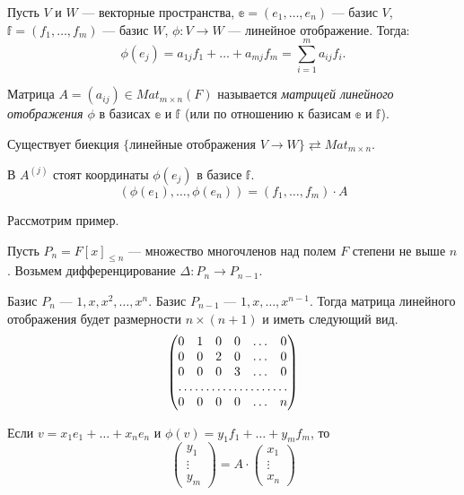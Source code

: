 Пусть $V$ и $W$ --- векторные пространства, $\mathbb{e} = (e_1, \ldots, e_n)$ --- базис $V$, $\mathbb{f} = (f_1, \ldots, f_m)$ --- базис $W$, $\phi: V \rightarrow W$ --- линейное отображение. Тогда:
\[
\phi(e_j) = a_{1j}f_1 + \ldots + a_{mj}f_m = \sum_{i = 1}^{m}a_{ij}f_i.
\]

\begin{Def}
Матрица $A = (a_{ij}) \in Mat_{m \times n}(F)$ называется \textit{матрицей линейного отображения $\phi$} в базисах $\mathbb{e}$ и $\mathbb{f}$ (или по отношению к базисам $\mathbb{e}$ и $\mathbb{f}$).
\end{Def}

\begin{Comment}
Существует биекция $\{\text{линейные отображения } V \rightarrow W \} \rightleftarrows Mat_{m\times n}$.
\end{Comment}

\begin{Comment}
В $A^{(j)}$ стоят координаты $\phi(e_j)$ в базисе $\mathbb{f}$.
\[
(\phi(e_1), \ldots, \phi(e_n)) = (f_1, \ldots, f_m)\cdot A
\]
\end{Comment}

Рассмотрим пример.

Пусть $P_n = F[x]_{\leqslant n}$ --- множество многочленов над полем $F$ степени не выше $n$. Возьмем дифференцирование $\Delta: P_n \rightarrow P_{n-1}$.

Базис $P_n$ --- $1, x, x^2, \ldots, x^n$. Базис $P_{n-1}$ --- $1, x, \ldots, x^{n-1}$. Тогда матрица линейного отображения будет размерности $n \times (n+1)$ и иметь следующий вид.
\[
\begin{pmatrix*}
0 & 1 & 0 & 0 & \dots & 0 \\
0 & 0 & 2 & 0 & \dots & 0 \\
0 & 0 & 0 & 3 & \dots & 0 \\
\hdotsfor{6} \\
0 & 0 & 0 & 0 & \dots & n
\end{pmatrix*}
\] 

\begin{Suggestion}
Если $v = x_1 e_1 + \ldots + x_ne_n$ и $\phi(v) = y_1f_1 + \ldots + y_mf_m$, то 
\[
\begin{pmatrix*}
y_1 \\
\vdots \\
y_m
\end{pmatrix*}
= A \cdot
\begin{pmatrix*}
x_1 \\
\vdots \\
x_n
\end{pmatrix*}
\]
\end{Suggestion}

